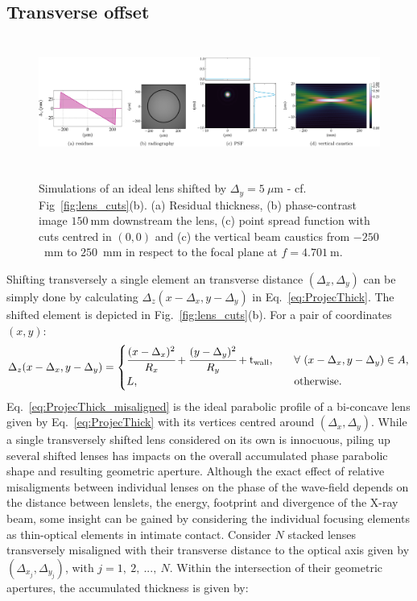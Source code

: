 \begin{refsection}
\subsection{Transverse offset}
\begin{figure}[t]
        \centering
         {\includegraphics[height=4.19cm]{figures/ch04/shifted_CRL.pdf}}
        \caption[Effects of a transverse CRL offset]{Simulations of an ideal lens shifted by $\Delta_y=5~\mu$m - cf. Fig~\ref{fig:lens_cuts}(b). (a) Residual thickness, (b) phase-contrast image $150~$mm downstream the lens, (c) point spread function with cuts centred in $(0,0)$ and (c) the vertical beam caustics from $-250$~mm to $250$~mm in respect to the focal plane at $f=4.701~$m.} \label{fig:shifted_CRL}
\end{figure}
Shifting transversely a single element an transverse distance $(\Delta_x,\Delta_y)$ can be simply done by calculating $\Delta_z(x-\Delta_x,y-\Delta_y)$ in Eq.~\ref{eq:ProjecThick}. The shifted element is depicted in Fig.~\ref{fig:lens_cuts}(b). For a pair of coordinates $(x,y)$:
\begin{equation}\label{eq:ProjecThick_misaligned}
    \Delta_z(x-\Delta_x,y-\Delta_y) = 
        \begin{cases}
      \cfrac{(x-\Delta_x)^2}{R_x}+\cfrac{(y-\Delta_y)^2}{R_y}+\text{t}_\text{wall}, &\quad\forall~(x-\Delta_x,y-\Delta_y) \in A,\\
      L, &\quad\text{otherwise}.
        \end{cases}
\end{equation}   
Eq.~\ref{eq:ProjecThick_misaligned} is the ideal parabolic profile of a bi-concave lens given by Eq.~\ref{eq:ProjecThick} with its vertices centred around $(\Delta_x,\Delta_y)$. While a single transversely shifted lens considered on its own is innocuous, piling up several shifted lenses has impacts on the overall accumulated phase parabolic shape and resulting geometric aperture. Although the exact effect of relative misaligments between individual lenses on the phase of the wave-field depends on the distance between lenslets, the energy, footprint and divergence of the X-ray beam, some insight can be gained by considering the individual focusing elements as thin-optical elements in intimate contact. Consider $N$ stacked lenses transversely misaligned with their transverse distance to the optical axis given by $(\Delta_{x_j},\Delta_{y_j})$, with $j=1,~2,~...,~N$. Within the intersection of their geometric apertures, the accumulated thickness is given by:

\end{refsection}
